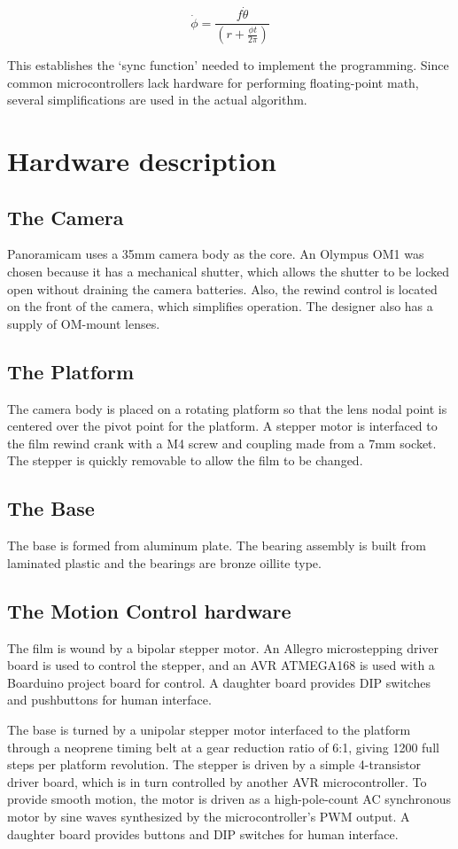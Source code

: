 \documentclass[dvips,12pt]{article}
\begin{document}
\begin{displaymath}
\dot{\phi} = \frac{f\dot{\theta}}{\left(r+\frac{\phi t}{2 \pi}\right)}
\end{displaymath}

This establishes the `sync function' needed to implement the programming. Since common microcontrollers lack hardware for performing floating-point math, several simplifications are used in the actual algorithm. 

\section{Hardware description}
\subsection{The Camera}
Panoramicam uses a 35mm camera body as the core. An Olympus OM1 was chosen because it has a mechanical shutter, which allows the shutter to be locked open without draining the camera batteries. Also, the rewind control is located on the front of the camera, which simplifies operation. The designer also has a supply of OM-mount lenses. 
\subsection{The Platform}
The camera body is placed on a rotating platform so that the lens nodal point is centered over the pivot point for the platform. A stepper motor is interfaced to the film rewind crank with a M4 screw and coupling made from a 7mm socket. The stepper is quickly removable to allow the film to be changed. 
\subsection{The Base}
The base is formed from aluminum plate. The bearing assembly is built from laminated plastic and the bearings are bronze oillite type. 


\subsection{The Motion Control hardware}
The film is wound by a bipolar stepper motor. An Allegro microstepping driver board is used to control the stepper, and an AVR ATMEGA168 is used with a Boarduino project board for control. A daughter board provides DIP switches and pushbuttons for human interface.

The base is turned by a unipolar stepper motor interfaced to the platform through a neoprene timing belt at a gear reduction ratio of 6:1, giving 1200 full steps per platform revolution. The stepper is driven by a simple 4-transistor driver board, which is in turn controlled by another AVR microcontroller. To provide smooth motion, the motor is driven as a high-pole-count AC synchronous motor by sine waves synthesized by the microcontroller's PWM output. A daughter board provides buttons and DIP switches for human interface.
\end{document}
